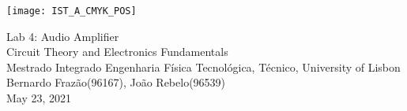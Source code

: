 
\thispagestyle {empty}

\texttt{[image: IST\_A\_CMYK\_POS]}

\begin{center}
%
\vspace{1.0cm}

\vspace{1cm}
{\FontLb Lab 4: Audio Amplifier} \\ %
\vspace{1cm}
{\FontSn Circuit Theory and Electronics Fundamentals} \\
\vspace{1cm}
{\FontSn Mestrado Integrado Engenharia Física Tecnológica, Técnico, University of Lisbon} \\ %
\vspace{1cm}
{\FontSn Bernardo Frazão(96167), João Rebelo(96539)} \\
\vspace{1cm}
{\FontSn May 23, 2021} \\ %
%
\end{center}

